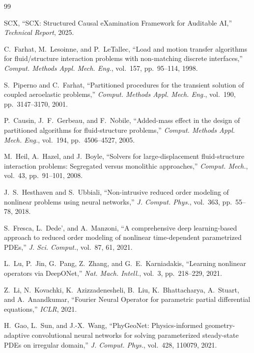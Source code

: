 \documentclass[11pt,a4paper]{article}
\theoremstyle{definition}
\begin{document}
\begin{thebibliography}{99}

SCX, ``SCX: Structured Causal eXamination Framework for Auditable AI,'' \textit{Technical Report}, 2025.

C.~Farhat, M.~Lesoinne, and P.~LeTallec, ``Load and motion transfer algorithms for fluid/structure interaction problems with non-matching discrete interfaces,'' \textit{Comput. Methods Appl. Mech. Eng.}, vol.~157, pp.~95--114, 1998.

S.~Piperno and C.~Farhat, ``Partitioned procedures for the transient solution of coupled aeroelastic problems,'' \textit{Comput. Methods Appl. Mech. Eng.}, vol.~190, pp.~3147--3170, 2001.

P.~Causin, J.~F.~Gerbeau, and F.~Nobile, ``Added-mass effect in the design of partitioned algorithms for fluid-structure problems,'' \textit{Comput. Methods Appl. Mech. Eng.}, vol.~194, pp.~4506--4527, 2005.

M.~Heil, A.~Hazel, and J.~Boyle, ``Solvers for large-displacement fluid-structure interaction problems: Segregated versus monolithic approaches,'' \textit{Comput. Mech.}, vol.~43, pp.~91--101, 2008.

J.~S.~Hesthaven and S.~Ubbiali, ``Non-intrusive reduced order modeling of nonlinear problems using neural networks,'' \textit{J. Comput. Phys.}, vol.~363, pp.~55--78, 2018.

S.~Fresca, L.~Dede', and A.~Manzoni, ``A comprehensive deep learning-based approach to reduced order modeling of nonlinear time-dependent parametrized PDEs,'' \textit{J. Sci. Comput.}, vol.~87, 61, 2021.

L.~Lu, P.~Jin, G.~Pang, Z.~Zhang, and G.~E.~Karniadakis, ``Learning nonlinear operators via DeepONet,'' \textit{Nat. Mach. Intell.}, vol.~3, pp.~218--229, 2021.

Z.~Li, N.~Kovachki, K.~Azizzadenesheli, B.~Liu, K.~Bhattacharya, A.~Stuart, and A.~Anandkumar, ``Fourier Neural Operator for parametric partial differential equations,'' \textit{ICLR}, 2021.

H.~Gao, L.~Sun, and J.-X.~Wang, ``PhyGeoNet: Physics-informed geometry-adaptive convolutional neural networks for solving parameterized steady-state PDEs on irregular domain,'' \textit{J. Comput. Phys.}, vol.~428, 110079, 2021.


\end{thebibliography}
\end{document}
